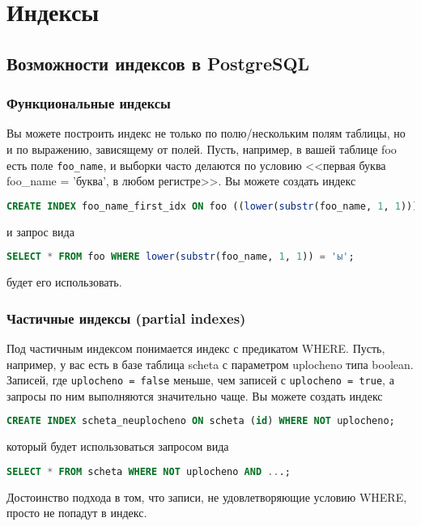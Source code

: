 \chapter{Индексы}

\begin{epigraphs}
\end{epigraphs}

\section{Возможности индексов в PostgreSQL}

\subsection{Функциональные индексы}

Вы можете построить индекс не только по полю/нескольким полям таблицы, но и по выражению, зависящему от полей. Пусть, например, в вашей таблице foo есть поле \lstinline!foo_name!, и выборки часто делаются по условию <<первая буква foo\_name = 'буква', в любом регистре>>. Вы можете создать индекс

\begin{lstlisting}[language=SQL,label=lst:summary-indexes1,caption=Индекс]
CREATE INDEX foo_name_first_idx ON foo ((lower(substr(foo_name, 1, 1))));
\end{lstlisting}

и запрос вида

\begin{lstlisting}[language=SQL,label=lst:summary-indexes2,caption=Запрос]
SELECT * FROM foo WHERE lower(substr(foo_name, 1, 1)) = 'ы';
\end{lstlisting}

будет его использовать.

\subsection{Частичные индексы (partial indexes)}

Под частичным индексом понимается индекс с предикатом WHERE. Пусть, например, у вас есть в базе таблица scheta с параметром uplocheno типа boolean. Записей, где \lstinline!uplocheno = false! меньше, чем записей с \lstinline!uplocheno = true!, а запросы по ним выполняются значительно чаще. Вы можете создать индекс

\begin{lstlisting}[language=SQL,label=lst:summary-indexes3,caption=Индекс]
CREATE INDEX scheta_neuplocheno ON scheta (id) WHERE NOT uplocheno;
\end{lstlisting}

который будет использоваться запросом вида

\begin{lstlisting}[language=SQL,label=lst:summary-indexes4,caption=Запрос]
SELECT * FROM scheta WHERE NOT uplocheno AND ...;
\end{lstlisting}

Достоинство подхода в том, что записи, не удовлетворяющие условию WHERE, просто не попадут в индекс.
